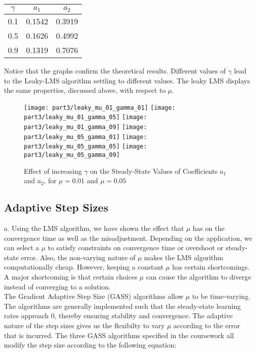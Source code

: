 \begin{table}[H]
\centering
\begin{tabular}{|c|c|c|}
\hline
$\gamma$ & $a_1$     & $a_2$     \\ \hline
0.1   & 0.1542 & 0.3919 \\ \hline
0.5   & 0.1626 & 0.4992 \\ \hline
0.9   & 0.1319 & 0.7076 \\ \hline
\end{tabular}
\end{table}

\noindent{}Notice that the graphs confirm the theoretical results. Different values of $\gamma$ lead to the Leaky-LMS algorithm settling to different values. The leaky LMS displays the same properties, discussed above, with respect to $\mu$.

\begin{figure}[H]
\centering{}
\texttt{[image: part3/leaky\_mu\_01\_gamma\_01]}
\texttt{[image: part3/leaky\_mu\_01\_gamma\_05]}
\texttt{[image: part3/leaky\_mu\_01\_gamma\_09]}
\texttt{[image: part3/leaky\_mu\_05\_gamma\_01]}
\texttt{[image: part3/leaky\_mu\_05\_gamma\_05]}
\texttt{[image: part3/leaky\_mu\_05\_gamma\_09]}
\caption{Effect of increasing $\gamma$ on the Steady-State Values of Coefficients $a_1$ and $a_2$, for $\mu=0.01$ and $\mu=0.05$}
\label{fig:leaky_lms}
\end{figure}

\subsection{Adaptive Step Sizes}

\noindent{}a. Using the LMS algorithm, we have shown the effect that $\mu$ has on the convergence time as well as the misadjustment. Depending on the application, we can select a $\mu$ to satisfy constraints on convergence time or overshoot or steady-state error. Also, the non-varying nature of $\mu$ makes the LMS algorithm computationally cheap. However, keeping a constant $\mu$ has certain shortcomings. A major shortcoming is that certain choices $\mu$ can cause the algorithm to diverge instead of converging to a solution. \\

\noindent{}The Gradient Adaptive Step Size (GASS) algorithms allow $\mu$ to be time-varying. The algorithms are generally implemented such that the steady-state learning rates approach 0, thereby ensuring stability and convergence. The adaptive nature of the step sizes gives us the flexibilty to vary $\mu$ according to the error that is incurred. The three GASS algorithms specified in the coursework all modify the step size according to the following equation:

